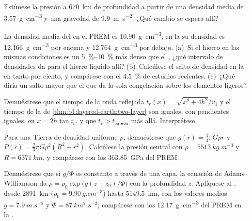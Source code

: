 \begin{exercise}[$\star\star$]\label{exo:b1:layered-earth:8}
Estímese la presión a \qty{670}{km} de profundidad a partir de una densidad media de \qty{3.57}{g.cm^{-3}} y una gravedad de
\qty{9.9}{m.s^{-2}}. ¿Qué cambio  se espera allí?
\end{exercise}

\begin{exercise}[$\star\star$]\label{exo:b1:layered-earth:9}
La densidad media del  en el PREM es \qty{10.90}{g.cm^{-3}}; en la  su densidad es
\qty{12.166}{g.cm^{-3}} por encima y \qty{12.764}{g.cm^{-3}} por debajo. (a)~Si el hierro en las mismas condiciones es un
\qtyrange{5}{10}{\percent} más denso que el , ¿qué intervalo de densidades da para el hierro líquido allí?
(b)~Calcúlese el salto de densidad en la  en tanto por ciento, y compárese con el \qty{4.5}{\percent}
de estudios recientes. (c)~¿Qué diría un salto
mayor que el que da la sola congelación sobre los elementos ligeros?
\end{exercise}

\begin{exercise}[$\star\star\star$]\label{exo:b1:layered-earth:10}
Demuéstrese que el tiempo de la onda reflejada $t_r(x) = \sqrt{x^2 + 4h^2}/v_1$ y el tiempo de la  de
\cref{thm:b1:layered-earth:two-layer} son iguales, con pendientes iguales, en $x = 2h\tan i_c$, y que $t_r > t_{\text{cabeza}}$
más allá. Interprétese.
\end{exercise}

\begin{exercise}[$\star\star\star$]\label{exo:b1:layered-earth:11}
Para una Tierra de densidad uniforme $\rho$, demuéstrese que $g(r) = \tfrac43\pi G\rho r$ y
$P(r) = \tfrac23\pi G\rho^2(R^2 - r^2)$. Calcúlese la presión central con $\rho = \qty{5513}{kg.m^{-3}}$ y
$R = \qty{6371}{km}$, y compárese con los \qty{363.85}{GPa} del PREM.
\end{exercise}

\begin{exercise}[$\star\star\star$]\label{exo:b1:layered-earth:12}
Demuéstrese que si $g/\Phi$ es constante a través de una capa, la ecuación de Adams--Williamson da
$\rho = \rho_0\exp\bigl(g(z - z_0)/\Phi\bigr)$ con la profundidad $z$. Aplíquese al , desde
\qty{2891}{km} ($\rho_0 =
\qty{9.90}{g.cm^{-3}}$) hasta \qty{5149.5}{km}, con los valores medios
$g = \qty{7.9}{m.s^{-2}}$ y $\Phi = \qty{87}{km^2.s^{-2}}$; compárese con los \qty{12.17}{g.cm^{-3}} del PREM en la .
\end{exercise}

